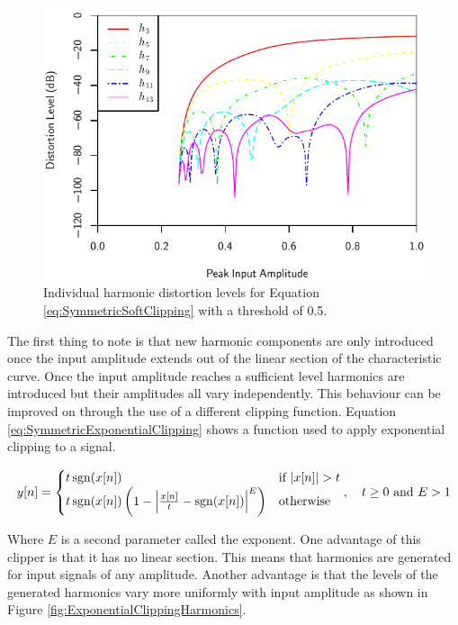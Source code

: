 			\begin{figure}[h!]
				\centering
				\includegraphics{chapter5/Images/SoftClippingHarmonics.pdf}
				\caption{Individual harmonic distortion levels for Equation \ref{eq:SymmetricSoftClipping}
					 with a threshold of 0.5.}
				\label{fig:SoftClippingHarmonics}
			\end{figure}

			The first thing to note is that new harmonic components are only introduced once the input
			amplitude extends out of the linear section of the characteristic curve. Once the input amplitude
			reaches a sufficient level harmonics are introduced but their amplitudes all vary independently.
			This behaviour can be improved on through the use of a different clipping function. Equation
			\ref{eq:SymmetricExponentialClipping} shows a function used to apply exponential clipping to a
			signal.
			
			\begin{equation}
				y[n] = \begin{cases}
					t\operatorname{sgn}(x[n]) & \text{if $\left|x[n]\right| > t$} \\
					t\operatorname{sgn}(x[n]) \left(1 - \left|\frac{x[n]}{t} - \operatorname{sgn}(x[n])\right|^{E} \right) &
						\text{otherwise}
				\end{cases}, \quad t \geq 0 \ \text{and} \ E > 1
				\label{eq:SymmetricExponentialClipping}
			\end{equation}

			Where $E$ is a second parameter called the exponent. One advantage of this clipper is that it has
			no linear section. This means that harmonics are generated for input signals of any amplitude.
			Another advantage is that the levels of the generated harmonics vary more uniformly with input
			amplitude as shown in Figure \ref{fig:ExponentialClippingHarmonics}.

